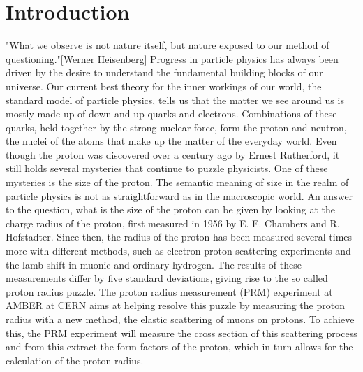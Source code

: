 \chapter{Introduction} \label{chap:introduction}
"What we observe is not nature itself, but nature exposed to our method of questioning."[Werner Heisenberg]\autocite{Heisenberg1958}
\newline
Progress in particle physics has always been driven by the desire to understand the fundamental building blocks of our universe.
\newline Our current best theory for the inner workings of our world,
the standard model of particle physics, tells us that the matter we see around us is mostly made up of down and up quarks and electrons.
Combinations of these quarks, held together by the strong nuclear force, form the proton and neutron, the nuclei of the atoms that make up the matter of the everyday world\autocite{Workman:2836514}.
Even though the proton was discovered over a century ago by Ernest Rutherford\autocite{discoveryProton}, it still holds several mysteries that continue to puzzle physicists.
One of these mysteries is the size of the proton.
\newline
The semantic meaning of size in the realm of particle physics is not as straightforward as in the macroscopic world. An answer to the question,
what is the size of the proton can be given by looking at the charge radius of the proton, first measured in 1956 by E. E. Chambers and R. Hofstadter\autocite{Hofstadter1956}.
\newline
Since then, the radius of the proton has been measured several times more with different methods, such as electron-proton scattering experiments and the lamb shift in muonic and ordinary hydrogen.
The results of these measurements differ by five standard deviations, giving rise to the so called proton radius puzzle\autocite{ProposalAmber}.
\newline
The proton radius measurement (PRM) experiment at AMBER at CERN aims at helping resolve this puzzle by measuring the proton radius with a new method,
the elastic scattering of muons on protons.
\newline
To achieve this, the PRM experiment will measure the cross section of this scattering process and from this extract the form factors of the proton, which in turn allows for the calculation of the proton radius.
